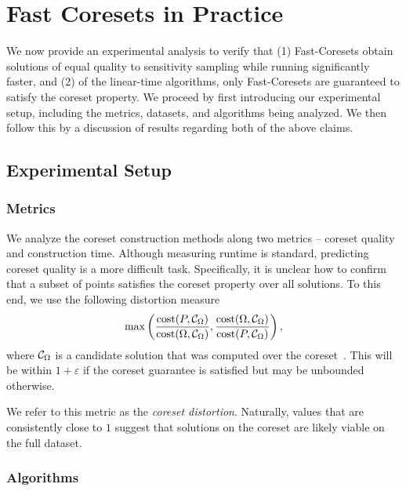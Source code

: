 \section{Fast Coresets in Practice}

We now provide an experimental analysis to verify that (1) Fast-Coresets obtain solutions of equal quality to sensitivity sampling while running significantly
faster, and (2) of the linear-time algorithms, only Fast-Coresets are guaranteed to satisfy the coreset property. We proceed by first
introducing our experimental setup, including the metrics, datasets, and algorithms being analyzed. We then follow this by a discussion of results regarding
both of the above claims.

\subsection{Experimental Setup}
\subsubsection{Metrics}

We analyze the coreset construction methods along two metrics -- coreset quality and construction time.  Although measuring runtime is standard, predicting coreset
quality is a more difficult task. Specifically, it is unclear how to confirm that a subset of points satisfies the coreset property over all solutions. To this
end, we use the following distortion measure
\[ \max \left( \dfrac{\operatorname{cost}(P, \mathcal C_{\Omega})}{\operatorname{cost}(\Omega, \mathcal C_{\Omega})}, \dfrac{\operatorname{cost}(\Omega, \mathcal C_{\Omega})}{\operatorname{cost}(P, \mathcal C_{\Omega})} \right),\]
where $\mathcal C_{\Omega}$ is a candidate solution that was computed over the coreset~\cite{chrisESA}. This will be within
$1+\varepsilon$ if the coreset guarantee is satisfied but may be unbounded otherwise. 

We refer to this metric as the \emph{coreset distortion}. Naturally, values that are consistently close to $1$ suggest that solutions on the coreset are likely
viable on the full dataset.


\subsubsection{Algorithms}
\label{ssec:algorithms}

